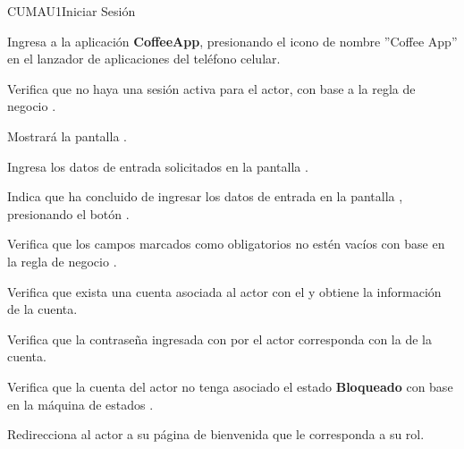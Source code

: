 \begin{UseCase}{CUMAU1}{Iniciar Sesión}
{\begin{Titemize}
			\Titem {}
			
			\Titem {}
			
			\Titem {}
		\end{Titemize}
		
	}
	\end{UseCase}
	
	
	\begin{UCtrayectoria}
		\UCpaso[\UCactor] Ingresa a la aplicación \textbf{CoffeeApp}, presionando el icono de nombre ''Coffee App'' en el lanzador de aplicaciones del teléfono celular.
		
		\UCpaso Verifica que no haya una sesión activa para el actor, con base a la regla de negocio .
		
		\UCpaso Mostrará la pantalla .
		
		\UCpaso[\UCactor] Ingresa los datos de entrada solicitados en la pantalla .
		
		\UCpaso[\UCactor] Indica que ha concluido de ingresar los datos de entrada en la pantalla , presionando el botón .\\
		
		\UCpaso Verifica que los campos marcados como obligatorios no estén vacíos con base en la regla de negocio . 
		
		\UCpaso Verifica que exista una cuenta asociada al actor con el  y obtiene la información de la cuenta.
		
		\UCpaso Verifica que la contraseña ingresada con por el actor corresponda con la  de la cuenta.
		
		\UCpaso Verifica que la cuenta del actor no tenga asociado el estado \textbf{Bloqueado} con base en la máquina de estados .
		
		\UCpaso Redirecciona al actor a su página de bienvenida que le corresponda a su rol.	
	\end{UCtrayectoria}
	

